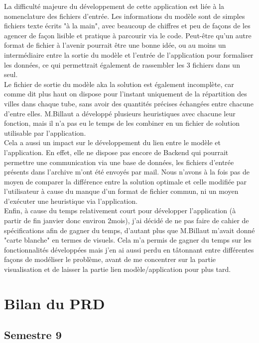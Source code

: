 \documentclass{polytech/polytech}
\numberwithin{figure}{chapter}
\begin{document}
La difficulté majeure du développement de cette application est liée à la nomenclature des fichiers d'entrée. Les informations du modèle sont de simples fichiers texte écrits "à la main", avec beaucoup de chiffres et peu de façons de les agencer de façon lisible et pratique à parcourir via le code. Peut-être qu'un autre format de fichier à l'avenir pourrait être une bonne idée, ou au moins un intermédiaire entre la sortie du modèle et l'entrée de l'application pour formaliser les données, ce qui permettrait également de rassembler les 3 fichiers dans un seul.\\

Le fichier de sortie du modèle aka la solution est également incomplète, car comme dit plus haut on dispose pour l'instant uniquement de la répartition des villes dans chaque tube, sans avoir des quantités précises échangées entre chacune d'entre elles. M.Billaut a développé plusieurs heuristiques avec chacune leur fonction, mais il n'a pas eu le temps de les combiner en un fichier de solution utilisable par l'application.\\

Cela a aussi un impact sur le développement du lien entre le modèle et l'application. En effet, elle ne dispose pas encore de Backend qui pourrait permettre une communication via une base de données, les fichiers d'entrée présents dans l'archive m'ont été envoyés par mail. Nous n'avons à la fois pas de moyen de comparer la différence entre la solution optimale et celle modifiée par l'utilisateur à cause du manque d'un format de fichier commun, ni un moyen d'exécuter une heuristique via l'application.\\ 

Enfin, à cause du temps relativement court pour développer l'application (à partir de fin janvier donc environ 2mois), j'ai décidé de ne pas faire de cahier de spécifications afin de gagner du temps, d'autant plus que M.Billaut m'avait donné "carte blanche" en termes de visuels. Cela m'a permis de gagner du temps sur les fonctionnalités développées mais j'en ai aussi perdu en tâtonnant entre différentes façons de modéliser le problème, avant de me concentrer sur la partie visualisation et de laisser la partie lien modèle/application pour plus tard.

\chapter{Bilan du PRD}

\section{Semestre 9}
\end{document}
